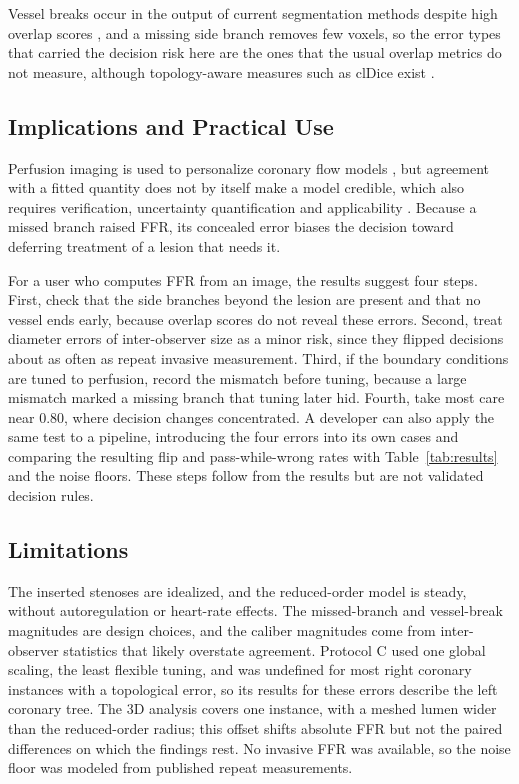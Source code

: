 \documentclass[journal]{IEEEtran}
\begin{document}
Vessel breaks occur in the output of current segmentation methods despite high overlap scores \cite{bransby2026},
and a missing side branch removes few voxels, so the error types that carried the decision risk here are the ones that the usual overlap metrics do not measure, although topology-aware measures such as clDice
exist \cite{shit2021}.

\subsection{Implications and Practical Use}
Perfusion imaging is used to personalize coronary flow models \cite{menon2024}, but agreement with a fitted
quantity does not by itself make a model credible, which also requires verification, uncertainty quantification and
applicability \cite{viceconti2025}. Because a missed branch raised FFR, its concealed error biases the
decision toward deferring treatment of a lesion that needs it.

For a user who computes FFR from an image, the results suggest four steps. First, check that the side branches
beyond the lesion are present and that no vessel ends early, because overlap scores do not reveal these errors.
Second, treat diameter errors of inter-observer size as a minor risk, since they flipped decisions about as often as
repeat invasive measurement. Third, if the boundary conditions are tuned to perfusion, record the mismatch before
tuning, because a large mismatch marked a missing branch that tuning later hid. Fourth, take most care near 0.80,
where decision changes concentrated. A developer can also apply the same test to a pipeline, introducing the four errors into its own cases
and comparing the resulting flip and pass-while-wrong rates with Table~\ref{tab:results} and the noise floors. These
steps follow from the results but are not validated decision rules.

\subsection{Limitations}
The inserted stenoses are idealized, and the reduced-order model is steady, without autoregulation or heart-rate
effects. The missed-branch and vessel-break magnitudes are design choices, and the caliber magnitudes come from
inter-observer statistics that likely overstate agreement. Protocol C used one global scaling, the least flexible
tuning, and was undefined for most right coronary instances with a topological error, so its results for these
errors describe the left coronary tree. The 3D analysis covers one instance, with a meshed lumen wider than the reduced-order radius; this offset shifts
absolute FFR but not the paired differences on which the findings rest. No invasive FFR was available, so the noise floor was modeled from published repeat
measurements.
\end{document}
